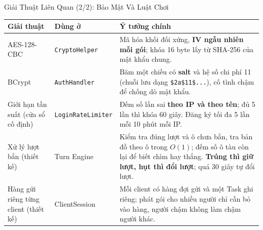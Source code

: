 \begin{frame}{Giải Thuật Liên Quan (2/2): Bảo Mật Và Luật Chơi}
  \footnotesize
  \begin{tabularx}{\textwidth}{@{}l l Y@{}}
    \toprule \textbf{Giải thuật} & \textbf{Dùng ở} & \textbf{Ý tưởng chính} \\ \midrule
    AES-128-CBC & \texttt{CryptoHelper} &
      Mã hóa khối đối xứng, \textbf{IV ngẫu nhiên mỗi gói}; khóa 16 byte lấy từ SHA-256 của mật khẩu chung. \\
    BCrypt & \texttt{AuthHandler} &
      Băm một chiều có \textbf{salt} và hệ số chi phí 11 (chuỗi lưu dạng \texttt{\$2a\$11\$...}), cố tình chậm để chống dò mật khẩu. \\
    Giới hạn tần suất (cửa sổ cố định) & \texttt{LoginRateLimiter} &
      Đếm số lần sai \textbf{theo IP và theo tên}; đủ 5 lần thì khóa 60 giây. Đăng ký tối đa 5 lần mỗi 10 phút mỗi IP. \\
    Xử lý lượt bắn (thiết kế) & Turn Engine &
      Kiểm tra đúng lượt và ô chưa bắn, tra bản đồ theo ô trong $O(1)$; đếm số ô tàu còn lại để biết chìm hay thắng. \textbf{Trúng thì giữ lượt, hụt thì đổi lượt}; quá 30 giây tự đổi lượt. \\
    Hàng gửi riêng từng client (thiết kế) & ClientSession &
      Mỗi client có hàng đợi gửi và một Task ghi riêng; phát gói cho nhiều người chỉ cần bỏ vào hàng, người chậm không làm chậm người khác. \\
    \bottomrule
  \end{tabularx}
\end{frame}

